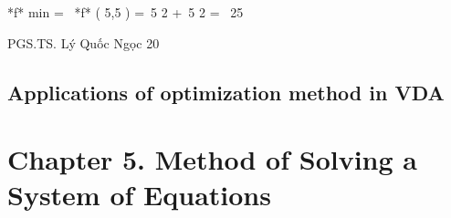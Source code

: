 







































*f* min =  *f* ( 5,5 ) = 5 2 + 5 2 =  25

PGS.TS. Lý Quốc Ngọc 20





\subsection{Applications of optimization method in VDA}

\newpage
\section{Chapter 5. Method of Solving a System of Equations}
